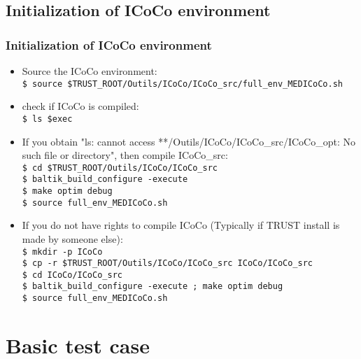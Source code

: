 \documentclass[10pt, hyperref={unicode=true,pdfusetitle, bookmarks=true,bookmarksnumbered=false,bookmarksopen=false, breaklinks=false,pdfborder={0 0 1},backref=true,colorlinks=true,linkcolor=darkblue,pageanchor, urlcolor=darkblue}]{beamer}
\begin{document}
\begin{frame}
\subsection{Initialization of ICoCo environment}
\frametitle{Initialization of ICoCo environment}
\begin{block}{}

\begin{itemize}

\item Source the ICoCo environment:\\
\hspace{-0.5cm}\texttt{\$ source \$TRUST\_ROOT/Outils/ICoCo/ICoCo\_src/full\_env\_MEDICoCo.sh}

\item check if ICoCo is compiled:\\
\texttt{\$ ls \$exec} 

\item If you obtain "ls: cannot access **/Outils/ICoCo/ICoCo\_src/ICoCo\_opt: No such file or directory", then compile ICoCo\_src:\\
\texttt{\$ cd \$TRUST\_ROOT/Outils/ICoCo/ICoCo\_src}\\
\texttt{\$ baltik\_build\_configure -execute}\\
\texttt{\$ make optim debug }\\
\texttt{\$ source full\_env\_MEDICoCo.sh}

\item If you do not have rights to compile ICoCo (Typically if TRUST install is made by someone else): \\
\texttt{\$ mkdir -p ICoCo}\\
\texttt{\$ cp -r \$TRUST\_ROOT/Outils/ICoCo/ICoCo\_src ICoCo/ICoCo\_src}\\
\texttt{\$ cd ICoCo/ICoCo\_src}\\
\texttt{\$ baltik\_build\_configure -execute ; make optim debug }\\
\texttt{\$ source full\_env\_MEDICoCo.sh}

\end{itemize}

\end{block}
\end{frame}


\section{{\bf{Basic test case}}}
\begin{frame}
\end{frame}
\end{document}
